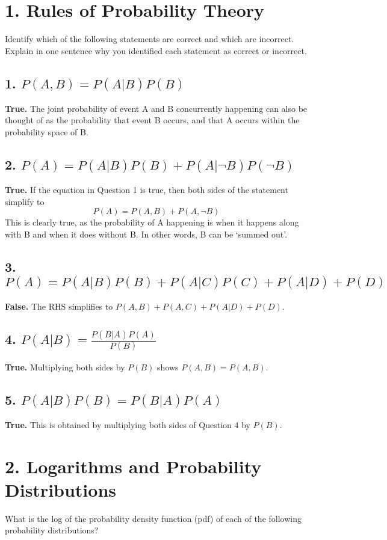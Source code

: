 \documentclass[11pt]{report}
\begin{document}
\section*{1. Rules of Probability Theory}
Identify which of the following statements are correct and which are incorrect. Explain in one sentence why you identified each statement as correct or incorrect.
\subsection*{ 1. $P(A,B) = P(A | B)P(B)$}
\textbf{True.} The joint probability of event A and B concurrently happening can also be thought of as the probability that event B occurs, and that A occurs within the probability space of B.
\subsection*{ 2. $P(A) = P(A | B)P(B) + P(A | \neg B) P(\neg B)$}
\textbf{True.} If the equation in Question 1 is true, then both sides of the statement simplify to $$P(A) = P(A,B)+P(A,\neg B) $$ This is clearly true, as the probability of A happening is when it happens along with B and when it does without B. In other words, B can be `summed out'. 
\subsection*{ 3. $P(A) = P(A | B)P(B) + P(A|C)P(C)+P(A|D) +P(D)$}
\textbf{False.} The  RHS simplifies to $P(A,B) + P(A,C) + P(A|D) + P(D)$.
\subsection*{ 4. $P(A|B) = \frac{P(B | A)P(A)}{P(B)} $}
\textbf{True.} Multiplying both sides by $P(B)$ shows $P(A,B) = P(A,B)$.
\subsection*{ 5. $P(A|B)P(B) = P(B|A)P(A)$}
\textbf{True.} This is obtained by multiplying both sides of Question 4 by $P(B)$.





\section*{2. 	Logarithms and Probability Distributions}
What is the log of the probability density function (pdf) of each of the following probability distributions?
\end{document}
